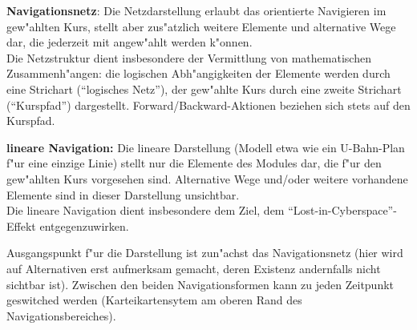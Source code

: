 \begin{list_sabina}
        \item \textbf{Navigationsnetz}: Die Netzdarstellung erlaubt das orientierte
          Navigieren im gew"ahlten Kurs, stellt aber zus"atzlich weitere
          Elemente und alternative Wege dar, die jederzeit mit angew"ahlt
          werden k"onnen. \\
          Die Netzstruktur dient insbesondere der Vermittlung von
          mathematischen Zusammenh"angen: die logischen Abh"angigkeiten der
          Elemente werden durch eine Strichart (``logisches Netz''), 
          der gew"ahlte Kurs durch eine zweite Strichart (``Kurspfad'')
          dargestellt. Forward/Backward-Aktionen beziehen sich stets
          auf den Kurspfad.
        \item \textbf{lineare Navigation:} Die lineare Darstellung (Modell
          etwa wie ein U-Bahn-Plan f"ur eine einzige Linie) stellt nur die
          Elemente des Modules dar, die f"ur den gew"ahlten Kurs vorgesehen
          sind. Alternative Wege und/oder weitere vorhandene Elemente sind in
          dieser Darstellung unsichtbar.\\
	  Die lineare Navigation dient insbesondere dem Ziel, dem 
	  ``Lost-in-Cyberspace''-Effekt entgegenzuwirken.
\end{list_sabina}


Ausgangspunkt f"ur die Darstellung ist zun"achst das Navigationsnetz (hier
wird auf Alternativen erst aufmerksam gemacht, deren Existenz andernfalls
nicht sichtbar ist). Zwischen den beiden Navigationsformen kann zu jeden
Zeitpunkt geswitched werden (Karteikartensytem am oberen Rand des
Navigationsbereiches).

